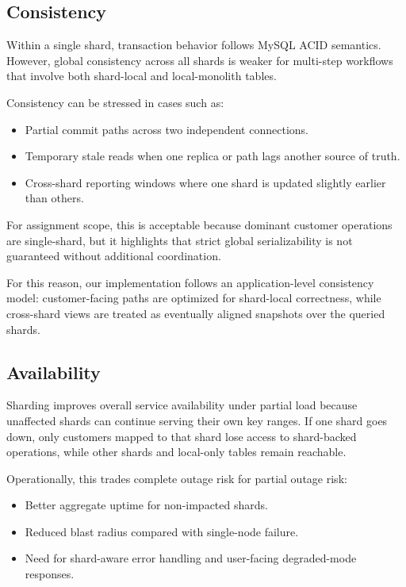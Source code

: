 \documentclass[12pt,a4paper]{article}
\begin{document}
\subsection{Consistency}

Within a single shard, transaction behavior follows MySQL ACID semantics. However,
global consistency across all shards is weaker for multi-step workflows that involve
both shard-local and local-monolith tables.

Consistency can be stressed in cases such as:

\begin{itemize}[leftmargin=*]
  \item Partial commit paths across two independent connections.
  \item Temporary stale reads when one replica or path lags another source of truth.
  \item Cross-shard reporting windows where one shard is updated slightly earlier than others.
\end{itemize}

For assignment scope, this is acceptable because dominant customer operations are
single-shard, but it highlights that strict global serializability is not guaranteed
without additional coordination.

For this reason, our implementation follows an application-level consistency model:
customer-facing paths are optimized for shard-local correctness, while cross-shard
views are treated as eventually aligned snapshots over the queried shards.

\subsection{Availability}

Sharding improves overall service availability under partial load because unaffected
shards can continue serving their own key ranges. If one shard goes down, only
customers mapped to that shard lose access to shard-backed operations, while other
shards and local-only tables remain reachable.

Operationally, this trades complete outage risk for partial outage risk:

\begin{itemize}[leftmargin=*]
  \item Better aggregate uptime for non-impacted shards.
  \item Reduced blast radius compared with single-node failure.
  \item Need for shard-aware error handling and user-facing degraded-mode responses.
\end{itemize}
\end{document}

